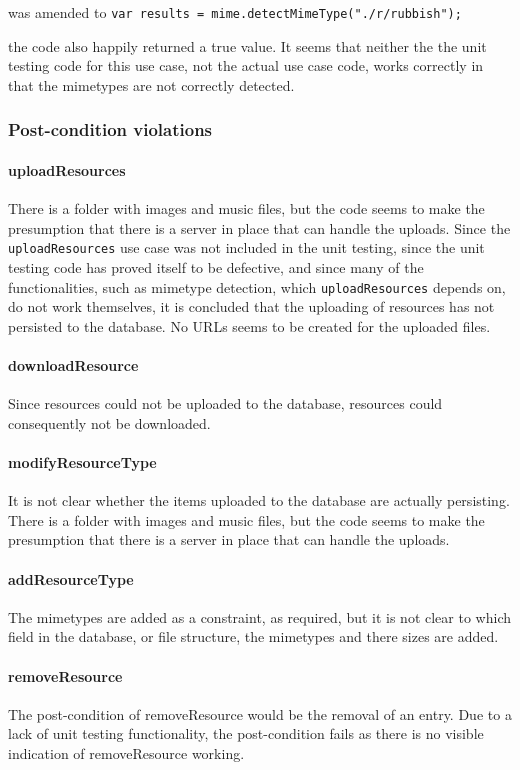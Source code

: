 \documentclass[a4paper]{article}
\begin{document}
was amended to \texttt{var results = mime.detectMimeType("./r/rubbish");}

the code also happily returned a true value. It seems that neither the the unit testing code for this use case, not the actual use case code, works correctly in that the mimetypes are not correctly detected.

\subsubsection {Post-condition violations}

\paragraph{uploadResources}
There is a folder with images and music files, but the code seems to make the presumption that there is a server in place that can handle the uploads. Since the \texttt{uploadResources} use case was not included in the unit testing, since the unit testing code has proved itself to be defective, and since many of the functionalities, such as mimetype detection, which \texttt{uploadResources} depends on, do not work themselves, it is concluded that the uploading of resources has not persisted to the database. No URLs seems to be created for the uploaded files. 

\paragraph{downloadResource}
Since resources could not be uploaded to the database, resources could consequently not be downloaded.

\paragraph{modifyResourceType}
It is not clear whether the items uploaded to the database are actually persisting. There is a folder with images and music files, but the code seems to make the presumption that there is a server in place that can handle the uploads.

\paragraph{addResourceType}
The mimetypes are added as a constraint, as required, but it is not clear to which field in the database, or file structure, the mimetypes and there sizes are added.

\paragraph{removeResource}
The post-condition of removeResource would be the removal of an entry. Due to a lack of unit testing functionality, the post-condition fails as there is no visible indication of removeResource working.
\end{document}
